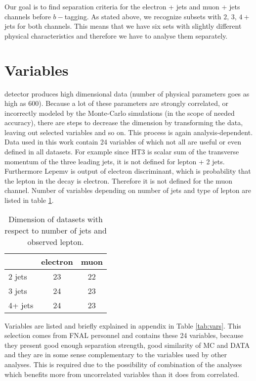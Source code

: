 Our goal is to find separation criteria for the electron + jets and muon + jets channels before $b-$tagging. As stated above, we recognize subsets with $2, \,3,\, 4+$ jets for both channels. This means that we have six sets with slightly different physical characteristics and therefore we have to analyse them separately. 

\section{Variables}

\dzero detector  produces high dimensional data (number of physical parameters  goes as high as $600$). Because a lot of these parameters are strongly correlated, or incorrectly modeled by the Monte-Carlo simulations (in the scope of needed accuracy), there are steps to decrease the dimension by transforming the data, leaving out selected variables and so on. This process is again analysis-dependent. Data used in this work contain 24 variables of which not all are useful or even defined in all datasets. For example since \textsf{HT3} is scalar sum of the transverse momentum of the three leading jets, it is not defined for lepton + 2 jets. Furthermore \textsf{Lepemv} is output of electron discriminant, which is probability that the lepton in the decay is electron. Therefore it is not defined for the muon channel. Number of variables depending on number of jets and type of lepton are listed in table \ref{tab:data-dims}.

\begin{table}[htb]
\caption{Dimension of datasets with respect to number of jets and observed lepton.}
\centering
\begin{tabular}{|l|c|c|}
\hline 
 & electron & muon \\ 
\hline 
2 jets & 23 & 22 \\ 
\hline 
3 jets & 24 & 23 \\ 
\hline 
4+ jets & 24 & 23 \\ 
\hline 
\end{tabular} 
\label{tab:data-dims}
\end{table}

Variables are listed and briefly explained in appendix in Table \ref{tab:vars}. This selection comes from  FNAL personnel and contains these 24 variables, because they present good enough separation strength, good similarity of MC and DATA and they are in some sense complementary to the variables used by other analyses. This is required due to the possibility of combination of the analyses which benefits more from uncorrelated variables than it does from correlated. 

